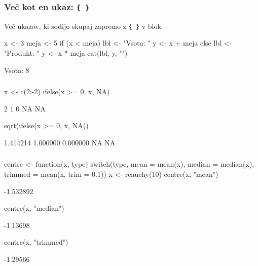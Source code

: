 \begin{frame}[fragile]
\frametitle{Več kot en ukaz: \verb"{ }"}
Več ukazov, ki sodijo skupaj zapremo z \verb"{ }" v blok

\begin{Schunk}
\begin{Sinput}
 x <- 3
 meja <- 5
 if (x < meja) {
     lbl <- "Vsota: "
     y <- x + meja
 } else {
     lbl <- "Produkt: "
     y <- x * meja
 }
 cat(lbl, y, "\n")
\end{Sinput}
\begin{Soutput}
Vsota:  8 
\end{Soutput}
\end{Schunk}
\end{frame}

\begin{frame}[fragile]
\frametitle{}
\begin{Schunk}
\begin{Sinput}
 x <- c(2:-2)
 ifelse(x >= 0, x, NA)
\end{Sinput}
\begin{Soutput}
[1]  2  1  0 NA NA
\end{Soutput}
\begin{Sinput}
 sqrt(ifelse(x >= 0, x, NA))
\end{Sinput}
\begin{Soutput}
[1] 1.414214 1.000000 0.000000       NA       NA
\end{Soutput}
\end{Schunk}
\end{frame}
\begin{frame}[fragile]
\frametitle{}
\begin{Schunk}
\begin{Sinput}
 centre <- function(x, type) {
     switch(type, mean = mean(x), median = median(x), 
         trimmed = mean(x, trim = 0.1))
 }
 x <- rcauchy(10)
 centre(x, "mean")
\end{Sinput}
\begin{Soutput}
[1] -1.532892
\end{Soutput}
\begin{Sinput}
 centre(x, "median")
\end{Sinput}
\begin{Soutput}
[1] -1.13698
\end{Soutput}
\begin{Sinput}
 centre(x, "trimmed")
\end{Sinput}
\begin{Soutput}
[1] -1.29566
\end{Soutput}
\end{Schunk}
\end{frame}

